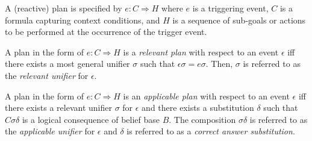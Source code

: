 \begin{ddefinition}
[Plan] A (reactive) plan is specified by $e : C \Rightarrow H$ where $e$ is a triggering event, $C$ is a formula capturing context conditions, and $H$ is a sequence of sub-goals or actions to be performed at the occurrence of the trigger event.
\end{ddefinition}

\begin{ddefinition}
 A plan in the form of $e : C \Rightarrow H$ is a \emph{relevant plan} with respect to an event $\epsilon$ iff there exists a most general unifier $\sigma$ such that $\epsilon\sigma = e\sigma$. Then, $\sigma$ is referred to as the \emph{relevant unifier} for $\epsilon$.
\end{ddefinition}

\begin{ddefinition}
 A plan in the form of $e : C \Rightarrow H$ is an \emph{applicable plan} with respect to an event $\epsilon$ iff there exists a relevant unifier $\sigma$ for $\epsilon$ and there exists a substitution $\delta$ such that $C\sigma\delta$
is a logical consequence of belief base $B$. The composition $\sigma\delta$ is referred to as the \emph{applicable unifier} for $\epsilon$ and $\delta$ is referred to as a \emph{correct answer substitution}.
\end{ddefinition}












